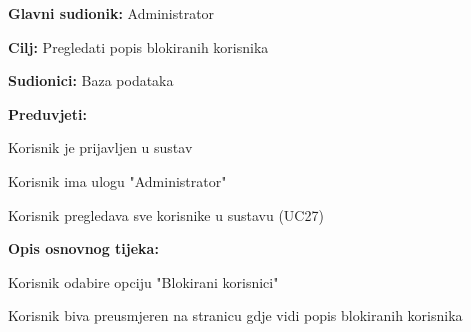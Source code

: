 					\noindent {}
					\begin{packed_item}
	
						\item \textbf{Glavni sudionik: }Administrator
						\item  \textbf{Cilj:} Pregledati popis blokiranih korisnika
						\item  \textbf{Sudionici:} Baza podataka
						\item  \textbf{Preduvjeti:}
						\item[] \begin{packed_enum}
							\item Korisnik je prijavljen u sustav
							\item Korisnik ima ulogu "Administrator"
							\item Korisnik pregledava sve korisnike u sustavu (UC27)
						\end{packed_enum}
						\item  \textbf{Opis osnovnog tijeka:}
						
						\item[] \begin{packed_enum}
	
							\item Korisnik odabire opciju "Blokirani korisnici"
							\item Korisnik biva preusmjeren na stranicu gdje vidi popis blokiranih korisnika
						\end{packed_enum}
					
					\end{packed_item}
					
